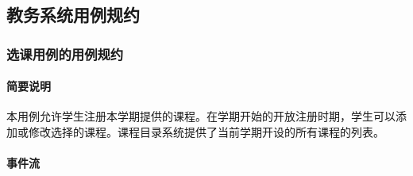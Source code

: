 \subsection{教务系统用例规约}
\subsubsection{选课用例的用例规约}

\paragraph{简要说明}
  
本用例允许学生注册本学期提供的课程。在学期开始的开放注册时期，学生可以添加或修改选择的课程。课程目录系统提供了当前学期开设的所有课程的列表。
  
\paragraph{事件流}
